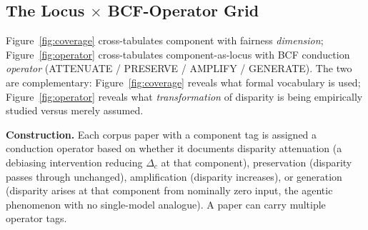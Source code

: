 \documentclass[acmsmall,nonacm]{acmart}
\begin{document}
\subsection{The Locus $\times$ BCF-Operator Grid}

Figure~\ref{fig:coverage} cross-tabulates component with fairness \emph{dimension}; Figure~\ref{fig:operator} cross-tabulates component-as-locus with BCF conduction \emph{operator} (ATTENUATE / PRESERVE / AMPLIFY / GENERATE). The two are complementary: Figure~\ref{fig:coverage} reveals what formal vocabulary is used; Figure~\ref{fig:operator} reveals what \emph{transformation} of disparity is being empirically studied versus merely assumed.

\textbf{Construction.} Each corpus paper with a component tag is assigned a conduction operator based on whether it documents disparity attenuation (a debiasing intervention reducing $\Delta_c$ at that component), preservation (disparity passes through unchanged), amplification (disparity increases), or generation (disparity arises at that component from nominally zero input, the agentic phenomenon with no single-model analogue). A paper can carry multiple operator tags.
\end{document}
